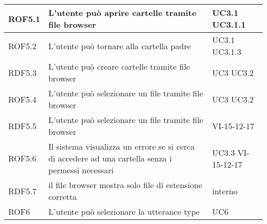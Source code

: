 \documentclass[../AnalisideiRequisiti.tex]{subfiles}
\begin{document}
\begin{longtable}{| p{3cm} | p{6cm} | p{3cm} |}
			\newline ROF5.1&
		\newline L'utente può aprire cartelle tramite file browser&
		\newline UC3.1 \newline UC3.1.1
		\\[1em]
		\hline
		
		\newline ROF5.2&
		\newline L'utente può tornare alla cartella padre&
		\newline UC3.1 \newline UC3.1.3
		\\[1em]
		\hline
		
		\newline RDF5.3&
		\newline L'utente può creare cartelle tramite file browser&
		\newline UC3 \newline UC3.2
		\\[1em]
		\hline
		
		\newline ROF5.4&
		\newline L'utente può selezionare un file tramite file browser&
		\newline UC3 \newline UC3.2
		\\[1em]	
		\hline
		
		\newline RDF5.5&
		\newline L'utente può selezionare un file tramite file browser&
		\newline VI-15-12-17
		\\[1em]	
		\hline
		
		\newline ROF5.6&
		\newline Il sistema visualizza un errore se si cerca di accedere ad una cartella senza i permessi necessari&
		\newline UC3.3 \newline VI-15-12-17
		\\[1em]	
		\hline
		\newline RDF5.7&
		\newline il file browser mostra solo file di estensione corretta&
		\newline interno
		\\[1em]
		\hline
		\newline ROF6&
		\newline L'utente può selezionare la utterance type&
		\newline UC6 
		\\[1em]
		\hline
				

\end{longtable}
\end{document}
